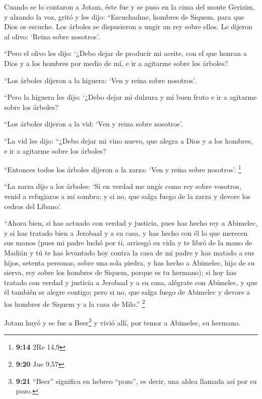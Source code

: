 \begin{paracol}{2}
 Cuando se lo contaron a Jotam, éste fue y se puso en la
cima del monte Gerizim, y alzando la voz, gritó y les dijo:
``Escuchadme, hombres de Siquem, para que Dios os escuche.
 Los árboles se dispusieron a ungir un rey sobre ellos. Le
dijeron al olivo: `Reina sobre nosotros'.

 ``Pero el olivo les dijo: `¿Debo dejar de producir mi
aceite, con el que honran a Dios y a los hombres por medio de mí, e ir a
agitarme sobre los árboles?

 ``Los árboles dijeron a la higuera: `Ven y reina sobre
nosotros'.

 ``Pero la higuera les dijo: `¿Debo dejar mi dulzura y mi
buen fruto e ir a agitarme sobre los árboles?

 ``Los árboles dijeron a la vid: `Ven y reina sobre
nosotros'.

 ``La vid les dijo: ``¿Debo dejar mi vino nuevo, que
alegra a Dios y a los hombres, e ir a agitarme sobre los árboles?

 ``Entonces todos los árboles dijeron a la zarza: `Ven y
reina sobre nosotros'. \footnote{\textbf{9:14} 2Re 14,9}

 ``La zarza dijo a los árboles: `Si en verdad me ungís
como rey sobre vosotros, venid a refugiaros a mi sombra; y si no, que
salga fuego de la zarza y devore los cedros del Líbano'.

 ``Ahora bien, si has actuado con verdad y justicia, pues
has hecho rey a Abimelec, y si has tratado bien a Jerobaal y a su casa,
y has hecho con él lo que merecen sus manos  (pues mi
padre luchó por ti, arriesgó su vida y te libró de la mano de Madián
 y tú te has levantado hoy contra la casa de mi padre y
has matado a sus hijos, setenta personas, sobre una sola piedra, y has
hecho a Abimelec, hijo de su sierva, rey sobre los hombres de Siquem,
porque es tu hermano);  si hoy has tratado con verdad y
justicia a Jerobaal y a su casa, alégrate con Abimelec, y que él también
se alegre contigo;  pero si no, que salga fuego de
Abimelec y devore a los hombres de Siquem y a la casa de Milo.''
\footnote{\textbf{9:20} Jue 9,57}

 Jotam huyó y se fue a Beer\footnote{\textbf{9:21}
  ``Beer'' significa en hebreo ``pozo'', es decir, una aldea llamada así
  por su pozo.} y vivió allí, por temor a Abimelec, su hermano.


\end{paracol}

